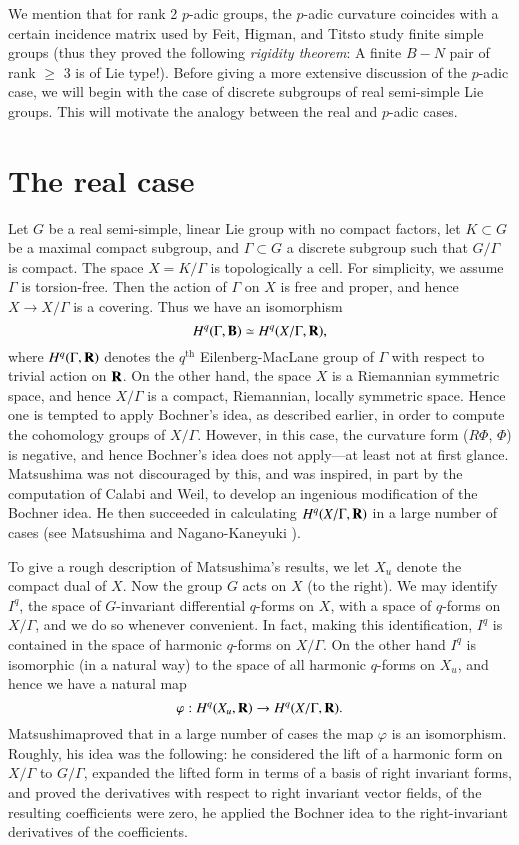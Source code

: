We mention that for rank 2 $p$-adic groups, the $p$-adic curvature coincides with a certain incidence matrix used by Feit, Higman, and Tits\pageoriginale to study finite simple groups (thus they proved the following \textit{rigidity theorem}: A finite $B-N$ pair of rank $\geqslant$ 3 is of Lie type!). Before giving a more extensive discussion of the $p$-adic case, we will begin with the case of discrete subgroups of real semi-simple Lie groups. This will motivate the analogy between the real and $p$-adic cases.

\section{The real case}\label{art3-sec2}
Let $G$ be a real semi-simple, linear Lie group with no compact factors, let $K \subset G$ be a maximal compact subgroup, and $\Gamma \subset G$ a discrete subgroup such that $G/\Gamma$ is compact. The space $X = K / \Gamma$ is topologically a cell. For simplicity, we assume $\Gamma$ is torsion-free. Then the action of $\Gamma$ on $X$ is free and proper, and hence $X \to X /\Gamma$ is a covering. Thus we have an isomorphism
$$
H^q (\Gamma, \mathbf{B}) \simeq H^q (X/\Gamma, \mathbf{R}),
$$
where $H^q (\Gamma, \mathbf{R})$ denotes the $q^{\text{th}}$ Eilenberg-MacLane group of $\Gamma$ with respect to trivial action on $\mathbf{R}$. On the other hand, the space $X$ is a Riemannian symmetric space, and hence $X/\Gamma$ is a compact, Riemannian, locally symmetric space. Hence one is tempted to apply Bochner's idea, as described earlier, in order to compute the cohomology groups of $X/\Gamma$. However, in this case, the curvature form ($R \Phi$, $\Phi$) is negative, and hence Bochner's idea does not apply---at least not at first glance. Matsushima was not discouraged by this, and was inspired, in part by the computation of Calabi and Weil, to develop an ingenious modification of the Bochner idea. He then succeeded in calculating $H^q (X/\Gamma, \mathbf{R})$ in a large number of cases (see Matsushima \cite{art3-key9} and Nagano-Kaneyuki \cite{art3-key10}).

To give a rough description of Matsushima's results, we let $X_u$ denote the compact dual of $X$. Now the group $G$ acts on $X$ (to the right). We may identify $I^q$, the space of $G$-invariant differential $q$-forms on $X$, with a space of $q$-forms on $X/\Gamma$, and we do so whenever convenient. In fact, making this identification, $I^q$ is contained in the space of harmonic $q$-forms on $X/\Gamma$. On the other hand $I^q$ is isomorphic (in a natural way) to the space of all harmonic $q$-forms on $X_u$, and hence we have a natural map
$$
\varphi : H^q (X_u, \mathbf{R}) \to H^q (X/ \Gamma, \mathbf{R}).
$$
Matsushima\pageoriginale proved that in a large number of cases the map $\varphi$ is an isomorphism. Roughly, his idea was the following: he considered the lift of a harmonic form on $X/\Gamma$ to $G/\Gamma$, expanded the lifted form in terms of a basis of right invariant forms, and proved the derivatives with respect to right invariant vector fields, of the resulting coefficients were zero, \iec he applied the Bochner idea to the right-invariant derivatives of the coefficients. 

